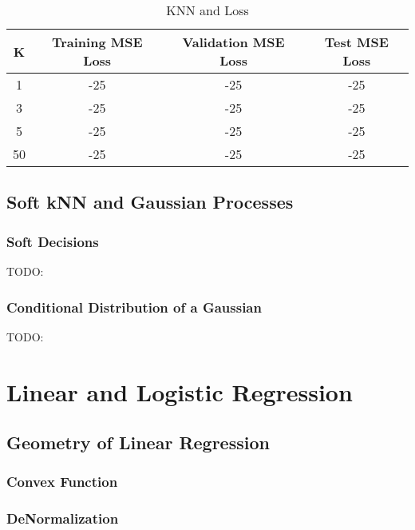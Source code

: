 \documentclass[a4paper,12pt]{article}
\begin{document}
\begin{table}[ht]
\centering %
\begin{tabular}{c c c c} %
\hline %
K & Training MSE Loss & Validation MSE Loss & Test MSE Loss \\ [0.5ex] 
\hline
1 & -25 & -25 & -25 \\ 
3 & -25 & -25 & -25 \\
5 & -25 & -25 & -25 \\
50 & -25 & -25 & -25 \\ [1ex] %
\hline %
\end{tabular}
\caption{KNN and Loss} %
\label{table:KLoss} %
\end{table}

\subsection{Soft kNN and Gaussian Processes}
\subsubsection{Soft Decisions}
TODO: 
\subsubsection{Conditional Distribution of a Gaussian}
TODO:
\section{Linear and Logistic Regression}
\subsection{Geometry of Linear Regression}
\subsubsection{Convex Function}
\subsubsection{DeNormalization}
\end{document}
